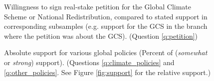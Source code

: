 
\begin{figure}[h!]
    \caption[Willingness to sign a real-stake petition]{Willingness to sign real-stake petition for the Global Climate Scheme or National Redistribution, compared to stated support in corresponding subsamples (e.g. support for the GCS in the branch where the petition was about the GCS). (Question \ref{q:petition})}\label{fig:petition}
\end{figure}

\begin{figure}[h!] %
    \caption[Absolute support for various global policies]{Absolute support for various global policies (Percent of (\textit{somewhat} or \textit{strong}) support). (Questions \ref{q:climate_policies} and \ref{q:other_policies}. See Figure \ref{fig:support} for the relative support.)}\label{fig:support_likert_positive}
\end{figure}

